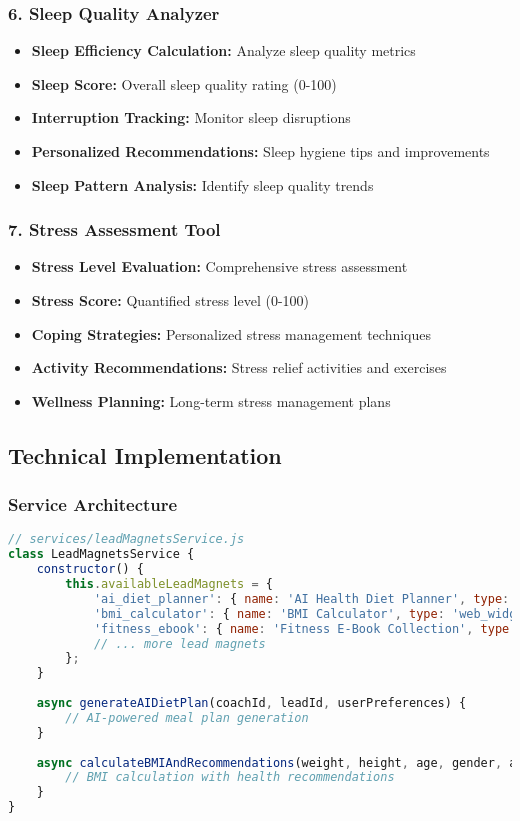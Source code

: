 \documentclass[12pt,a4paper]{article}
\begin{document}
\subsubsection{6. Sleep Quality Analyzer}
\begin{itemize}
    \item \textbf{Sleep Efficiency Calculation:} Analyze sleep quality metrics
    \item \textbf{Sleep Score:} Overall sleep quality rating (0-100)
    \item \textbf{Interruption Tracking:} Monitor sleep disruptions
    \item \textbf{Personalized Recommendations:} Sleep hygiene tips and improvements
    \item \textbf{Sleep Pattern Analysis:} Identify sleep quality trends
\end{itemize}

\subsubsection{7. Stress Assessment Tool}
\begin{itemize}
    \item \textbf{Stress Level Evaluation:} Comprehensive stress assessment
    \item \textbf{Stress Score:} Quantified stress level (0-100)
    \item \textbf{Coping Strategies:} Personalized stress management techniques
    \item \textbf{Activity Recommendations:} Stress relief activities and exercises
    \item \textbf{Wellness Planning:} Long-term stress management plans
\end{itemize}

\subsection{Technical Implementation}

\subsubsection{Service Architecture}
\begin{lstlisting}[language=JavaScript]
// services/leadMagnetsService.js
class LeadMagnetsService {
    constructor() {
        this.availableLeadMagnets = {
            'ai_diet_planner': { name: 'AI Health Diet Planner', type: 'whatsapp_chat' },
            'bmi_calculator': { name: 'BMI Calculator', type: 'web_widget' },
            'fitness_ebook': { name: 'Fitness E-Book Collection', type: 'downloadable' },
            // ... more lead magnets
        };
    }
    
    async generateAIDietPlan(coachId, leadId, userPreferences) {
        // AI-powered meal plan generation
    }
    
    async calculateBMIAndRecommendations(weight, height, age, gender, activityLevel) {
        // BMI calculation with health recommendations
    }
}
\end{lstlisting}
\end{document}
